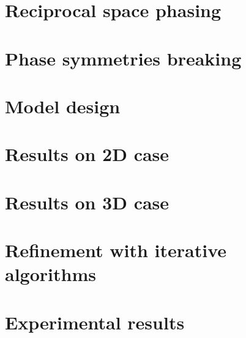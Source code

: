 \section{Reciprocal space phasing}\label{chp:phasing}
\section{Phase symmetries breaking}\label{chp:phasing}
\section{Model design}\label{chp:phasing}
\section{Results on 2D case}\label{chp:phasing}
\section{Results on 3D case}\label{chp:phasing}
\section{Refinement with iterative algorithms}\label{chp:phasing}
\section{Experimental results}\label{chp:phasing}

